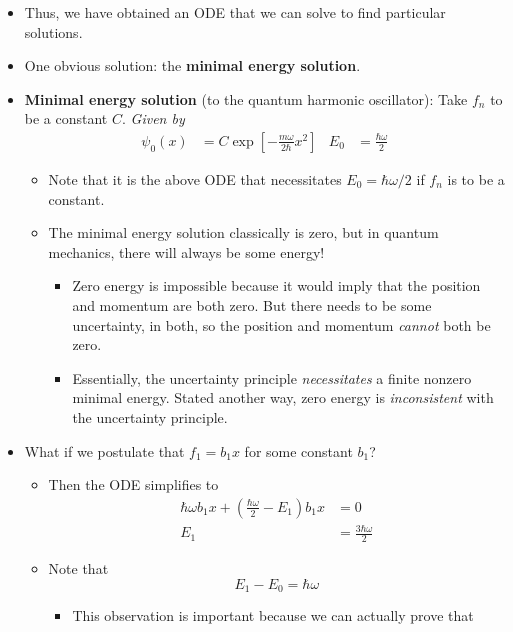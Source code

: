 \documentclass[../notes.tex]{subfiles}
\begin{document}
\begin{itemize}
\begin{itemize}
    \end{itemize}
    \item Thus, we have obtained an ODE that we can solve to find particular solutions.
    \item One obvious solution: the \textbf{minimal energy solution}.
    \item \textbf{Minimal energy solution} (to the quantum harmonic oscillator): Take $f_n$ to be a constant $C$. \emph{Given by}
    \begin{align*}
        \psi_0(x) &= C\exp[-\frac{m\omega}{2\hbar}x^2]&
        E_0 &= \frac{\hbar\omega}{2}
    \end{align*}
    \begin{itemize}
        \item Note that it is the above ODE that necessitates $E_0=\hbar\omega/2$ if $f_n$ is to be a constant.
        \item The minimal energy solution classically is zero, but in quantum mechanics, there will always be some energy!
        \begin{itemize}
            \item Zero energy is impossible because it would imply that the position and momentum are both zero. But there needs to be some uncertainty, in both, so the position and momentum \emph{cannot} both be zero.
            \item Essentially, the uncertainty principle \emph{necessitates} a finite nonzero minimal energy. Stated another way, zero energy is \emph{inconsistent} with the uncertainty principle.
        \end{itemize}
    \end{itemize}
    \item What if we postulate that $f_1=b_1x$ for some constant $b_1$?
    \begin{itemize}
        \item Then the ODE simplifies to
        \begin{align*}
            \hbar\omega b_1x+\left( \frac{\hbar\omega}{2}-E_1 \right)b_1x &= 0\\
            E_1 &= \frac{3\hbar\omega}{2}
        \end{align*}
        \item Note that
        \begin{equation*}
            E_1-E_0 = \hbar\omega
        \end{equation*}
        \begin{itemize}
            \item This observation is important because we can actually prove that

\end{itemize}
\end{itemize}
\end{itemize}
\end{document}
